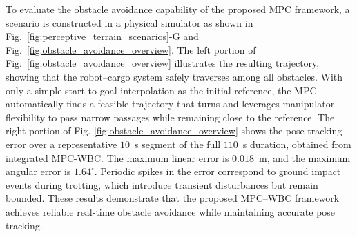 To evaluate the obstacle avoidance capability of the proposed MPC framework, a scenario is constructed in a physical simulator as shown in Fig.~\ref{fig:perceptive_terrain_scenarios}-G and Fig.~\ref{fig:obstacle_avoidance_overview}. 
The left portion of Fig.~\ref{fig:obstacle_avoidance_overview} illustrates the resulting trajectory, showing that the robot--cargo system safely traverses among all obstacles. 
With only a simple start-to-goal interpolation as the initial reference, the MPC automatically finds a feasible trajectory that turns and leverages manipulator flexibility to pass narrow passages while remaining close to the reference. 
The right portion of Fig. \ref{fig:obstacle_avoidance_overview} shows the pose tracking error over a representative $10$~s segment of the full $110$~s duration, obtained from integrated MPC-WBC. 
The maximum linear error is $0.018$~m, and the maximum angular error is $1.64^\circ$. Periodic spikes in the error correspond to ground impact events during trotting, which introduce transient disturbances but remain bounded. These results demonstrate that the proposed MPC--WBC framework achieves reliable real-time obstacle avoidance while maintaining accurate pose tracking.

